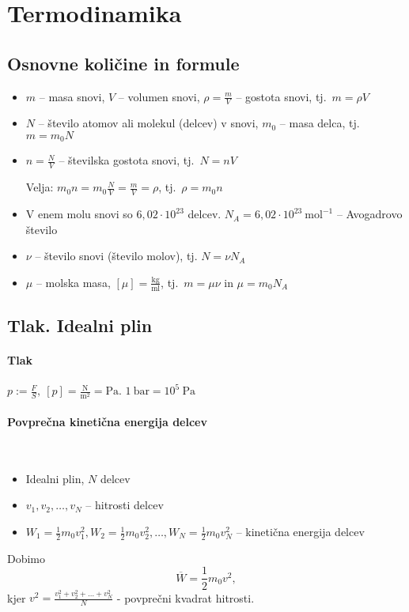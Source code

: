 \section{Termodinamika}
\subsection{Osnovne količine in formule}
\begin{itemize}
    \item \(m\) -- masa snovi, \(V\) -- volumen snovi, \(\rho = \frac{m}{V}\) -- gostota snovi, tj.\ \(m = \rho V\)
    \item \(N\) -- število atomov ali molekul (delcev) v snovi, \(m_0\) -- masa delca, tj.\ \(m = m_0 N\)
    \item \(n = \frac{N}{V}\) -- številska gostota snovi, tj.\ \(N = nV\)
    
    Velja: \(m_0 n = m_0 \frac{N}{V} = \frac{m}{V} = \rho\), tj.\ \(\rho = m_0 n\)
    \item V enem molu snovi so \(6,02 \cdot 10^{23}\) delcev. \(N_A = 6,02 \cdot 10^{23} \ \text{mol}^{-1}\) -- Avogadrovo število
    \item \(\nu\) -- število snovi (število molov), tj. \(N = \nu N_A\)
    \item \(\mu\) -- molska masa, \([\mu] = \frac{\text{kg}}{\text{ml}}\), tj.\ \(m = \mu \nu\) in \(\mu = m_0 N_A\)
\end{itemize}

\newpage
\subsection{Tlak. Idealni plin}
\paragraph{Tlak} \(p:= \frac{F}{S}, \ [p] = \frac{\text{N}}{\text{m}^2} = \text{Pa}\). \(1 \ \text{bar} = 10^5 \ \text{Pa}\)
\paragraph{Povprečna kinetična energija delcev} \ 
\begin{itemize}
    \item Idealni plin, \(N\) delcev
    \item \(v_1, v_2, \ldots, v_N\) -- hitrosti delcev
    \item \(W_1 = \frac{1}{2}m_0v_1^2, W_2 = \frac{1}{2}m_0v_2^2, \ldots, W_N = \frac{1}{2}m_0v_N^2\) -- kinetična energija delcev
\end{itemize}
Dobimo
\[\overline{W} = \frac{1}{2} m_0v^2,\]
kjer \(v^2 = \frac{v_1^2 + v_2^2+\ldots+v_N^2}{N}\) - povprečni kvadrat hitrosti.
